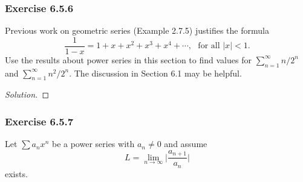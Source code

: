 \subsubsection{Exercise 6.5.6} Previous work on geometric series (Example 2.7.5) justifies the formula 
\[  \frac{ 1 }{ 1 -x  } = 1 + x + x^2 + x^3 + x^4 + \dotsb, \text{~ for all } |  x  |  < 1. \]
Use the results about power series in this section to find values for \( \sum_{ n= 1  }^{ \infty  } n/ 2^n  \) and \( \sum_{ n=1  }^{ \infty  } n^2 / 2^n \). The discussion in Section 6.1 may be helpful.
\begin{proof}[Solution]

\end{proof}


\subsubsection{Exercise 6.5.7} Let \( \sum a_n x^n \) be a power series with \( a_n \neq 0  \) and assume 
\[  L = \lim_{ n \to \infty  } \Big| \frac{ a_{n+1} }{ a_{n} }  \Big|  \] exists.
